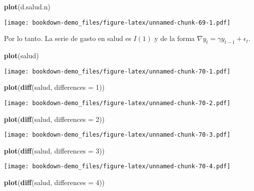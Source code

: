 \documentclass[]{book}
\newenvironment{Shaded}{\begin{snugshade}}{\end{snugshade}}
\newcommand{\KeywordTok}[1]{\textcolor[rgb]{0.13,0.29,0.53}{\textbf{#1}}}
\newcommand{\DataTypeTok}[1]{\textcolor[rgb]{0.13,0.29,0.53}{#1}}
\newcommand{\DecValTok}[1]{\textcolor[rgb]{0.00,0.00,0.81}{#1}}
\newcommand{\NormalTok}[1]{#1}
\theoremstyle{definition}
\theoremstyle{definition}
\theoremstyle{definition}
\theoremstyle{remark}
\begin{document}
\begin{Shaded}
\begin{Highlighting}[]
\KeywordTok{plot}\NormalTok{(d.salud.n)}
\end{Highlighting}
\end{Shaded}

\texttt{[image: bookdown-demo\_files/figure-latex/unnamed-chunk-69-1.pdf]}

Por lo tanto. La serie de gasto en salud es \(I(1)\) y de la forma
\(\nabla y_t = \gamma y_{t-1}+ \epsilon_t\).

\begin{Shaded}
\begin{Highlighting}[]
\KeywordTok{plot}\NormalTok{(salud)}
\end{Highlighting}
\end{Shaded}

\texttt{[image: bookdown-demo\_files/figure-latex/unnamed-chunk-70-1.pdf]}

\begin{Shaded}
\begin{Highlighting}[]
\KeywordTok{plot}\NormalTok{(}\KeywordTok{diff}\NormalTok{(salud, }\DataTypeTok{differences =} \DecValTok{1}\NormalTok{))}
\end{Highlighting}
\end{Shaded}

\texttt{[image: bookdown-demo\_files/figure-latex/unnamed-chunk-70-2.pdf]}

\begin{Shaded}
\begin{Highlighting}[]
\KeywordTok{plot}\NormalTok{(}\KeywordTok{diff}\NormalTok{(salud, }\DataTypeTok{differences =} \DecValTok{2}\NormalTok{))}
\end{Highlighting}
\end{Shaded}

\texttt{[image: bookdown-demo\_files/figure-latex/unnamed-chunk-70-3.pdf]}

\begin{Shaded}
\begin{Highlighting}[]
\KeywordTok{plot}\NormalTok{(}\KeywordTok{diff}\NormalTok{(salud, }\DataTypeTok{differences =} \DecValTok{3}\NormalTok{))}
\end{Highlighting}
\end{Shaded}

\texttt{[image: bookdown-demo\_files/figure-latex/unnamed-chunk-70-4.pdf]}

\begin{Shaded}
\begin{Highlighting}[]
\KeywordTok{plot}\NormalTok{(}\KeywordTok{diff}\NormalTok{(salud, }\DataTypeTok{differences =} \DecValTok{4}\NormalTok{))}
\end{Highlighting}
\end{Shaded}
\end{document}
